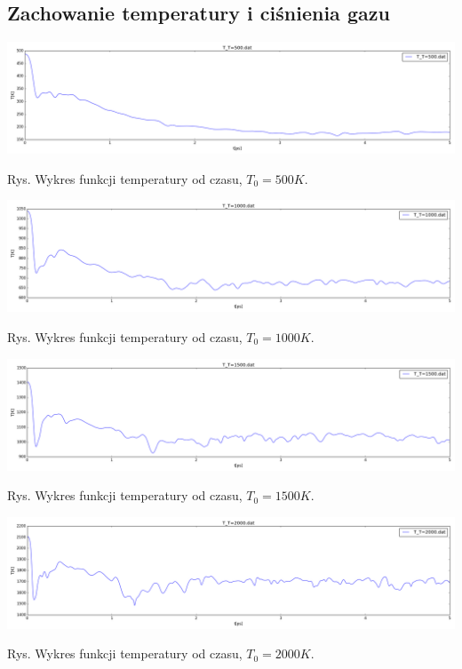 \documentclass[polish,polish,a4paper,11pt]{article}
\begin{document}
\subsection{Zachowanie temperatury i ciśnienia gazu}
\begin{center}
\includegraphics[scale=0.3]{../Data/T_T=500.png}
\end{center}
\begin{center}
Rys.  Wykres funkcji temperatury od czasu, $T_0 = 500K$.
\end{center}
\begin{center}
\includegraphics[scale=0.3]{../Data/T_T=1000.png}
\end{center}
\begin{center}
Rys.  Wykres funkcji temperatury od czasu, $T_0 = 1000K$.
\end{center}
\begin{center}
\includegraphics[scale=0.3]{../Data/T_T=1500.png}
\end{center}
\begin{center}
Rys.  Wykres funkcji temperatury od czasu, $T_0 = 1500K$.
\end{center}
\begin{center}
\includegraphics[scale=0.3]{../Data/T_T=2000.png}
\end{center}
\begin{center}
Rys.  Wykres funkcji temperatury od czasu, $T_0 = 2000K$.
\end{center}
 
\end{document}
